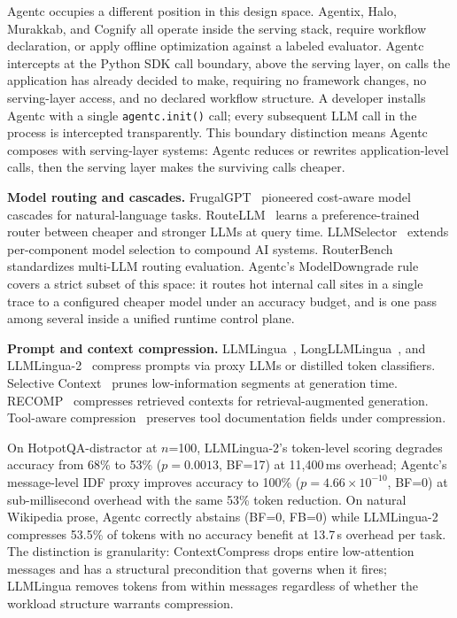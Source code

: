 Agentc occupies a different position in this design space. Agentix, Halo, Murakkab,
and Cognify all operate inside the serving stack, require workflow declaration, or
apply offline optimization against a labeled evaluator. Agentc intercepts at the
Python SDK call boundary, above the serving layer, on calls the application has
already decided to make, requiring no framework changes, no serving-layer access, and
no declared workflow structure. A developer installs Agentc with a single
\texttt{agentc.init()} call; every subsequent LLM call in the process is intercepted
transparently. This boundary distinction means Agentc composes with serving-layer
systems: Agentc reduces or rewrites application-level calls, then the serving layer
makes the surviving calls cheaper.

\textbf{Model routing and cascades.} FrugalGPT~\cite{chen2024frugalgpt} pioneered
cost-aware model cascades for natural-language tasks. RouteLLM~\cite{ong2025routellm}
learns a preference-trained router between cheaper and stronger LLMs at query time.
LLMSelector~\cite{chen2025llmselector} extends per-component model selection to
compound AI systems. RouterBench~\cite{hu2024routerbench} standardizes multi-LLM
routing evaluation. Agentc's ModelDowngrade rule covers a strict subset of this
space: it routes hot internal call sites in a single trace to a configured cheaper
model under an accuracy budget, and is one pass among several inside a unified runtime
control plane.

\textbf{Prompt and context compression.} LLMLingua~\cite{jiang2023llmlingua},
LongLLMLingua~\cite{jiang2024longllmlingua}, and
LLMLingua-2~\cite{pan2024llmlingua2} compress prompts via proxy LLMs or distilled
token classifiers. Selective Context~\cite{li2023selective} prunes low-information
segments at generation time. RECOMP~\cite{xu2024recomp} compresses retrieved contexts
for retrieval-augmented generation. Tool-aware
compression~\cite{xu2024toolcompress} preserves tool documentation fields under
compression.

On HotpotQA-distractor at $n$=100, LLMLingua-2's token-level scoring degrades
accuracy from 68\% to 53\% ($p=0.0013$, BF=17) at 11{,}400\,ms overhead; Agentc's
message-level IDF proxy improves accuracy to 100\% ($p=4.66\times10^{-10}$, BF=0) at
sub-millisecond overhead with the same 53\% token reduction. On natural Wikipedia
prose, Agentc correctly abstains (BF=0, FB=0) while LLMLingua-2 compresses 53.5\%
of tokens with no accuracy benefit at 13.7\,s overhead per task. The distinction is
granularity: ContextCompress drops entire low-attention messages and has a structural
precondition that governs when it fires; LLMLingua removes tokens from within messages
regardless of whether the workload structure warrants compression.

